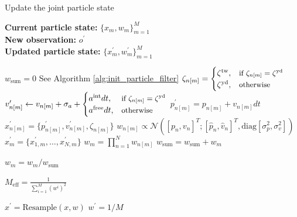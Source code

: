 \begin{algorithm}[h]
    \caption{Update the joint particle state}\label{alg:particle_filter}
    \hspace*{\algorithmicindent} \textbf{Current particle state:} $\{x_m,w_m\}^M_{m=1}$ \\
    \hspace*{\algorithmicindent} \textbf{New observation:} $o^\prime$ \\
    \hspace*{\algorithmicindent} \textbf{Updated particle state:} $\{x_m^\prime,w_m^\prime\}^M_{m=1}$ 
   
    \begin{algorithmic}[1]
    \State $w_\mathrm{sum}=0$
            \State See Algorithm \ref{alg:init_particle_filter}
         \Else
            \State $\zeta_{n[m]}= \begin{cases}
                            \zeta^\mathrm{tw}, & \text{\small if $\zeta_{n[m]}= \zeta^\mathrm{yd}$} \\
                            \zeta^\mathrm{yd}, & \text{\small otherwise}
                        \end{cases}$
            \EndIf
            \State $v_{n[m]}^\prime \gets v_{n[m]} + \sigma_a + \begin{cases}
                            a^\mathrm{int} dt, & \text{\small if $\zeta_{n[m]}= \zeta^\mathrm{yd}$} \\
                            a^\mathrm{free} dt, & \text{\small otherwise}
                        \end{cases}$ 
             \State $p_{n[m]}^\prime = p_{n[m]} + v_{n[m]} dt$
         \EndIf
        \State $x_{n[m]}^\prime = \{p_{n[m]}^\prime, v_{n[m]}^\prime, \zeta_{n[m]}\}$
        \State $w_{n[m]} \propto \mathcal{N}([p_n, v_n]^T ; [\hat{p}_n, \hat{v}_n]^T, \mathrm{diag}[\sigma_p^2, \sigma_v^2])$
        \EndFor
        \State $x_{m}^\prime = \{x_{1,m}^\prime, \dots, x_{N,m}^\prime\}$
        \State $w_m = \prod_{n=1}^N w_{n[m]}$ 
        \State $w_\mathrm{sum}=w_\mathrm{sum}+w_m$
    \EndFor

        \State $w_m=w_m / w_\mathrm{sum}$
    \EndFor
    
    \State $M_\mathrm{eff} = \frac{1}{\sum^M_{i=1}(w^i)^2}$
    \vspace{0.5em}
        
        \State $x^\prime = \text{Resample}(x,w)$
        \State $w^\prime = 1/M$
    \EndIf
        
    \end{algorithmic}
\end{algorithm}

